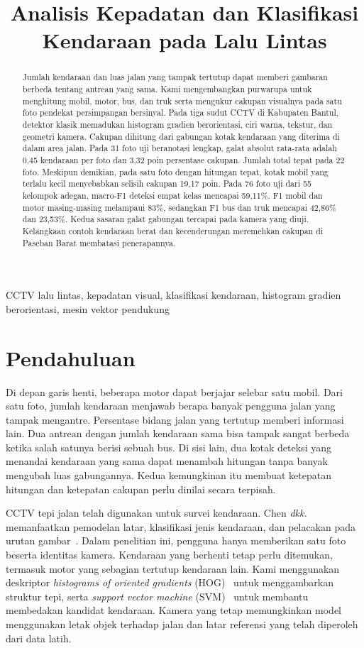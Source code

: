 \documentclass[conference,a4paper]{IEEEtran}
\title{Analisis Kepadatan dan Klasifikasi Kendaraan pada Lalu Lintas}
\author{\IEEEauthorblockN{\begin{tabular}{@{}c@{\hspace{6mm}}c@{\hspace{6mm}}c@{}}
Hanafi Khairul Shiddiq & Naila Syakira & Helena Koronka Innarmastia
\end{tabular}\\[3pt]
\begin{tabular}{@{}c@{\hspace{6mm}}c@{}}
Gilbard Kinan Nangwaya & Tenno Cahyo Berliantoko
\end{tabular}}
\IEEEauthorblockA{Program Studi Ilmu Komputer, Fakultas Matematika dan Ilmu Pengetahuan Alam\\Universitas Gadjah Mada, Yogyakarta, Indonesia}}
\begin{document}
\raggedbottom
\maketitle

\begin{abstract}
Jumlah kendaraan dan luas jalan yang tampak tertutup dapat memberi gambaran berbeda tentang antrean yang sama. Kami mengembangkan purwarupa untuk menghitung mobil, motor, bus, dan truk serta mengukur cakupan visualnya pada satu foto pendekat persimpangan bersinyal. Pada tiga sudut CCTV di Kabupaten Bantul, detektor klasik memadukan histogram gradien berorientasi, ciri warna, tekstur, dan geometri kamera. Cakupan dihitung dari gabungan kotak kendaraan yang diterima di dalam area jalan. Pada 31 foto uji beranotasi lengkap, galat absolut rata-rata adalah 0,45 kendaraan per foto dan 3,32 poin persentase cakupan. Jumlah total tepat pada 22 foto. Meskipun demikian, pada satu foto dengan hitungan tepat, kotak mobil yang terlalu kecil menyebabkan selisih cakupan 19,17 poin. Pada 76 foto uji dari 55 kelompok adegan, macro-F1 deteksi empat kelas mencapai 59,11\%. F1 mobil dan motor masing-masing melampaui 83\%, sedangkan F1 bus dan truk mencapai 42,86\% dan 23,53\%. Kedua sasaran galat gabungan tercapai pada kamera yang diuji. Kelangkaan contoh kendaraan berat dan kecenderungan meremehkan cakupan di Paseban Barat membatasi penerapannya.
\end{abstract}

\begin{IEEEkeywords}
CCTV lalu lintas, kepadatan visual, klasifikasi kendaraan, histogram gradien berorientasi, mesin vektor pendukung
\end{IEEEkeywords}

\section{Pendahuluan}
Di depan garis henti, beberapa motor dapat berjajar selebar satu mobil. Dari satu foto, jumlah kendaraan menjawab berapa banyak pengguna jalan yang tampak mengantre. Persentase bidang jalan yang tertutup memberi informasi lain. Dua antrean dengan jumlah kendaraan sama bisa tampak sangat berbeda ketika salah satunya berisi sebuah bus. Di sisi lain, dua kotak deteksi yang menandai kendaraan yang sama dapat menambah hitungan tanpa banyak mengubah luas gabungannya. Kedua kemungkinan itu membuat ketepatan hitungan dan ketepatan cakupan perlu dinilai secara terpisah.

CCTV tepi jalan telah digunakan untuk survei kendaraan. Chen \textit{dkk.} memanfaatkan pemodelan latar, klasifikasi jenis kendaraan, dan pelacakan pada urutan gambar~\cite{chen}. Dalam penelitian ini, pengguna hanya memberikan satu foto beserta identitas kamera. Kendaraan yang berhenti tetap perlu ditemukan, termasuk motor yang sebagian tertutup kendaraan lain. Kami menggunakan deskriptor \textit{histograms of oriented gradients} (HOG)~\cite{hog} untuk menggambarkan struktur tepi, serta \textit{support vector machine} (SVM)~\cite{svm} untuk membantu membedakan kandidat kendaraan. Kamera yang tetap memungkinkan model menggunakan letak objek terhadap jalan dan latar referensi yang telah diperoleh dari data latih.
\end{document}
